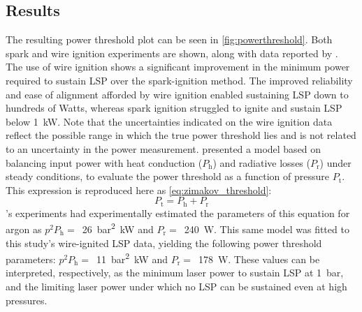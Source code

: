         \subsection{Results}
            The resulting power threshold plot can be seen in \autoref{fig:powerthreshold}. Both spark and wire ignition experiments are shown, along with data reported by \textcite{zimakovInteractionNearIRLaser2016,matsuiGeneratingConditionsArgon2019,luCharacteristicDiagnosticsLaserStabilized2022}. The use of wire ignition shows a significant improvement in the minimum power required to sustain LSP over the spark-ignition method. The improved reliability and ease of alignment afforded by wire ignition enabled sustaining LSP down to hundreds of Watts, whereas spark ignition struggled to ignite and sustain LSP below \qty{1}{kW}. Note that the uncertainties indicated on the wire ignition data reflect the possible range in which the true power threshold lies and is not related to an uncertainty in the power measurement. \textcite{zimakovInteractionNearIRLaser2016} presented a model based on balancing input power with heat conduction ($P_\mathrm{h}$) and radiative losses ($P_\mathrm{r}$) under steady conditions, to evaluate the power threshold as a function of pressure $P_\mathrm{t}$. This expression is reproduced here as \autoref{eq:zimakov_threshold}:
            \begin{equation} \label{eq:zimakov_threshold}
                P_\mathrm{t} = P_\mathrm{h} + P_\mathrm{r}
            \end{equation}
            \citeauthor{zimakovInteractionNearIRLaser2016}'s experiments had experimentally estimated the parameters of this equation for argon as $p^2P_\mathrm{h} =$~\qty{26}{bar^2.kW} and $P_\mathrm{r} =$~\qty{240}{W}. This same model was fitted to this study's wire-ignited LSP data, yielding the following power threshold parameters: $p^2P_\mathrm{h} =$~\qty{11}{bar^2.kW} and $P_\mathrm{r} =$~\qty{178}{W}. These values can be interpreted, respectively, as the minimum laser power to sustain LSP at \qty{1}{bar}, and the limiting laser power under which no LSP can be sustained even at high pressures. 


